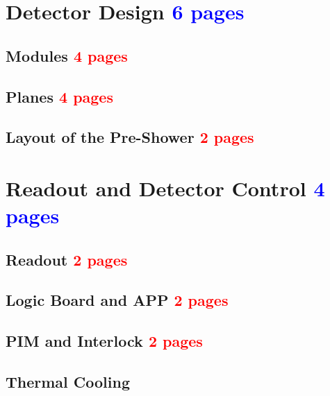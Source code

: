 		
		
		
		
		
		
		
		
		
		
		
	\clearpage
	\section{Detector Design \textcolor{blue}{ 6 pages}}
		\subsection{Modules \textcolor{red}{ 4 pages}}
		\subsection{Planes \textcolor{red}{ 4 pages}}
		\subsection{Layout of the Pre-Shower  \textcolor{red}{ 2 pages}}
		
	\clearpage	
	\section{Readout and Detector Control  \textcolor{blue}{ 4 pages}}
		\subsection{Readout \textcolor{red}{ 2 pages}}
		\subsection{Logic Board and APP \textcolor{red}{ 2 pages}}
		\subsection{PIM and Interlock \textcolor{red}{ 2 pages}}
		\subsection{Thermal Cooling}